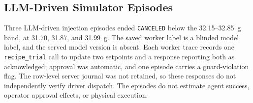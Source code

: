 \subsection{LLM-Driven Simulator Episodes}
\label{sec:eval-agent}
Three LLM-driven injection episodes ended \texttt{CANCELED} below the 32.15--32.85~g band, at 31.70, 31.87, and 31.99~g. The saved worker label is a blinded model label, and the served model version is absent. Each worker trace records one \texttt{recipe\_trial} call to update two setpoints and a response reporting both as acknowledged; approval was automatic, and one episode carries a guard-violation flag. The row-level server journal was not retained, so these responses do not independently verify driver dispatch. The episodes do not estimate agent success, operator approval effects, or physical execution.


